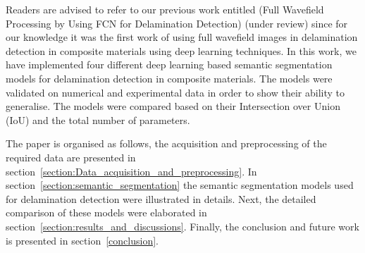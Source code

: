 Readers are advised to refer to our previous work entitled (Full Wavefield Processing by Using FCN for Delamination Detection) (under review) since for our knowledge it was the first work of using full wavefield images in delamination detection in composite materials using deep learning techniques. 
In this work, we have implemented four different deep learning based semantic segmentation models for delamination detection in composite materials.
The models were validated on numerical and experimental data in order to show their ability to generalise.
The models were compared based on their Intersection over Union (IoU) and the total number of parameters.

The paper is organised as follows, the acquisition and preprocessing of the required data are presented in section~\ref{section:Data_acquisition_and_preprocessing}.
In section~\ref{section:semantic_segmentation} the semantic segmentation models used for delamination detection were illustrated in details. 
Next, the detailed comparison of these models were elaborated in section~\ref{section:results_and_discussions}.
Finally, the conclusion and future work is presented in section~\ref{conclusion}.